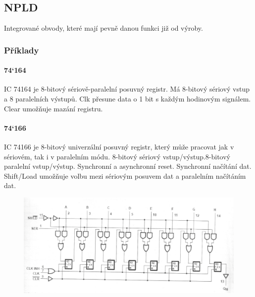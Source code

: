 \subsection{NPLD}
Integrované obvody, které mají pevně danou funkci již od výroby.

\subsubsection{Příklady}
\paragraph{74`164}
IC 74164 je 8-bitový sériově-paralelní posuvný registr. Má 8-bitový sériový vstup a 8 paralelních výstupů. Clk přesune data o 1 bit s každým hodinovým signálem. Clear umožňuje mazání registru.
\paragraph{74`166}
IC 74166 je 8-bitový univerzální posuvný registr, který může pracovat jak v sériovém, tak i v paralelním módu. 8-bitový sériový vstup/výstup.8-bitový paralelní vstup/výstup. Synchronní a asynchronní reset. Synchronní načítání dat. Shift/Load umožňuje volbu mezi sériovým posuvem dat a paralelním načítáním dat.
\begin{figure}[htbp]
\centering
\includegraphics[scale=0.4]{sections/3_pld_npld/images/74166.png}
\end{figure}
